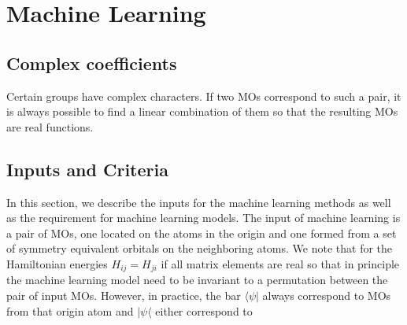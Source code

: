 \documentclass{article}
\begin{document}
\section{Machine Learning}

\subsection{Complex coefficients}
Certain groups have complex characters. If two MOs correspond to such a pair, it is always possible to 
find a linear combination of them so that the resulting MOs are real functions. 

\subsection{Inputs and Criteria}
In this section, we describe the inputs for the machine learning methods as well as the 
requirement for machine learning models. 
The input of machine learning is a pair of MOs, one located on the atoms in the origin
and one formed from a set of symmetry equivalent orbitals on the neighboring atoms. We note that 
for the Hamiltonian energies $H_{ij} = H_{ji}$ if all matrix elements are real so that 
in principle the machine learning model need to be invariant to a permutation between the 
pair of input MOs. However, in practice, the bar $\langle \psi |$ always correspond to MOs 
from that origin atom and $|\psi\langle$ either correspond to 
\end{document}
